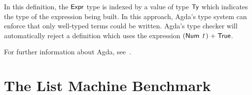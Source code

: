 \documentclass[sigconf]{acmart}
\theoremstyle{definition}
\newcommand{\D}[1]{\blue{\mathsf{#1}}}
\newcommand{\Con}[1]{\red{\mathsf{#1}}}
\newcommand{\F}[1]{\green{\mathsf{#1}}}
\newcommand{\V}[1]{\purple{\mathit{#1}}}
\begin{document}
In this definition, the \ensuremath{\D{Expr}} type is indexed by a value of type \ensuremath{\D{Ty}} which
indicates the type of the expression being built. In this approach, Agda's
type system can enforce that only well-typed terms could be written.
Agda's type checker will automatically reject a definition which uses the expression \ensuremath{(\Con{Num}\;\V{1})\;\F{+}\;\Con{True}}.

%


For further information about Agda, see~\cite{Norell2009,Stump16}.




\section{The List Machine Benchmark}\label{sec:list}
\end{document}
